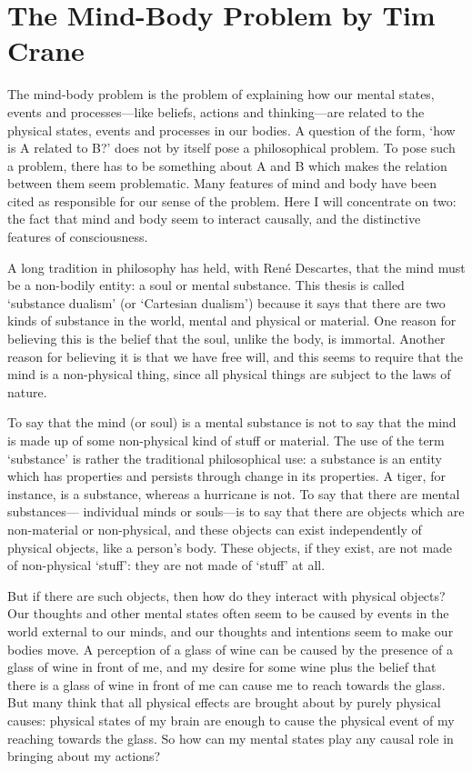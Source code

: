 \chapter{The Mind-Body Problem by Tim Crane}\autocite{Crane1}
\label{mindbodyprob}
\setcounter{ff}{\thefootnote}
\setcounter{footnote}{0}
The mind-body problem is the problem of explaining how our mental states, events
and processes—like beliefs, actions and thinking—are related to the physical states,
events and processes in our bodies. A question of the form, ‘how is A related to B?’
does not by itself pose a philosophical problem. To pose such a problem, there has to
be something about A and B which makes the relation between them seem
problematic. Many features of mind and body have been cited as responsible for our
sense of the problem. Here I will concentrate on two: the fact that mind and body
seem to interact causally, and the distinctive features of consciousness.

A long tradition in philosophy has held, with René Descartes, that the mind
must be a non-bodily entity: a soul or mental substance. This thesis is called
‘substance dualism’ (or ‘Cartesian dualism’) because it says that there are two kinds
of substance in the world, mental and physical or material. One reason for believing
this is the belief that the soul, unlike the body, is immortal. Another reason for
believing it is that we have free will, and this seems to require that the mind is a
non-physical thing, since all physical things are subject to the laws of nature.

To say that the mind (or soul) is a mental substance is not to say that the mind is
made up of some non-physical kind of stuff or material. The use of the term
‘substance’ is rather the traditional philosophical use: a substance is an entity which
has properties and persists through change in its properties. A tiger, for instance, is a
substance, whereas a hurricane is not. To say that there are mental substances—
individual minds or souls—is to say that there are objects which are non-material or
non-physical, and these objects can exist independently of physical objects, like a
person’s body. These objects, if they exist, are not made of non-physical ‘stuff’: they
are not made of ‘stuff’ at all.

But if there are such objects, then how do they interact with physical objects?
Our thoughts and other mental states often seem to be caused by events in the world
external to our minds, and our thoughts and intentions seem to make our bodies
move. A perception of a glass of wine can be caused by the presence of a glass of
wine in front of me, and my desire for some wine plus the belief that there is a glass
of wine in front of me can cause me to reach towards the glass. But many think that
all physical effects are brought about by purely physical causes: physical states of
my brain are enough to cause the physical event of my reaching towards the glass.
So how can my mental states play any causal role in bringing about my actions?

